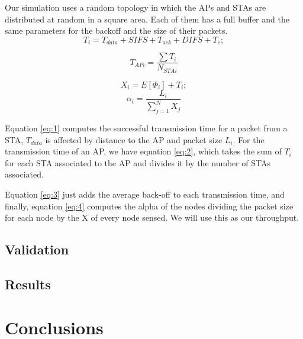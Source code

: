 \documentclass{article}
\begin{document}
	Our simulation uses a random topology in which the APs and STAs are distributed at random in a square area. Each of them has a full buffer and the same parameters for the backoff and the size of their packets.
	\begin{equation}
		\label{eq:1}
	    T_{i}= T_{data} + SIFS + T_{ack} + DIFS + T_e;
	\end{equation}
	
	\begin{equation}
		\label{eq:2}
	    T_{APi}=\frac{\sum T_i}{N_{STAi}}
	\end{equation}
	
	\begin{equation}
		\label{eq:3}
	   X_i=E[\Phi_i]+T_i;
	\end{equation}
	\begin{equation}
		\label{eq:4}
	    \alpha_i = \frac{L_i}{\sum_{j=1}^{N} X_{j}}
	\end{equation}
	
	Equation \ref{eq:1} computes the successful transmission time for a packet from a STA, $T_{data}$ is affected by distance to the AP and packet size $L_i$. For the transmission time of an AP, we have equation \ref{eq:2}, which takes the sum of $T_i$ for each STA associated to the AP and divides it by the number of STAs associated.
	
	Equation \ref{eq:3} just adds the average back-off to each transmission time, and finally, equation \ref{eq:4} computes the alpha of the nodes dividing the packet size for each node by the X of every node sensed. We will use this as our throughput.

	\subsection{Validation}
	\label{section:validation}
	
	\subsection{Results}
	\label{section:results}

\section{Conclusions}
\label{section:conclusions}



\end{document}
